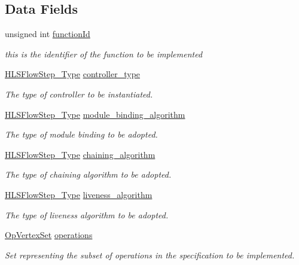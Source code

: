 \subsection*{Data Fields}
\begin{DoxyCompactItemize}
\item 
unsigned int \hyperlink{classhls_a0eaba14187fb5e60a90d3f35d2b138e0}{function\+Id}
\begin{DoxyCompactList}\small\item\em this is the identifier of the function to be implemented \end{DoxyCompactList}\item 
\hyperlink{hls__step_8hpp_ada16bc22905016180e26fc7e39537f8d}{H\+L\+S\+Flow\+Step\+\_\+\+Type} \hyperlink{classhls_a901e0a985cea95b069602fbdf0cdcc94}{controller\+\_\+type}
\begin{DoxyCompactList}\small\item\em The type of controller to be instantiated. \end{DoxyCompactList}\item 
\hyperlink{hls__step_8hpp_ada16bc22905016180e26fc7e39537f8d}{H\+L\+S\+Flow\+Step\+\_\+\+Type} \hyperlink{classhls_a28821b6aa53285a11d8753f1eee83f51}{module\+\_\+binding\+\_\+algorithm}
\begin{DoxyCompactList}\small\item\em The type of module binding to be adopted. \end{DoxyCompactList}\item 
\hyperlink{hls__step_8hpp_ada16bc22905016180e26fc7e39537f8d}{H\+L\+S\+Flow\+Step\+\_\+\+Type} \hyperlink{classhls_aee1a6f122114edf0772f7026143f39f9}{chaining\+\_\+algorithm}
\begin{DoxyCompactList}\small\item\em The type of chaining algorithm to be adopted. \end{DoxyCompactList}\item 
\hyperlink{hls__step_8hpp_ada16bc22905016180e26fc7e39537f8d}{H\+L\+S\+Flow\+Step\+\_\+\+Type} \hyperlink{classhls_afc2f0f903285b792466d4b0b09e26905}{liveness\+\_\+algorithm}
\begin{DoxyCompactList}\small\item\em The type of liveness algorithm to be adopted. \end{DoxyCompactList}\item 
\hyperlink{classOpVertexSet}{Op\+Vertex\+Set} \hyperlink{classhls_a93d8454c7ca39afe832a6fd7cbabd227}{operations}
\begin{DoxyCompactList}\small\item\em Set representing the subset of operations in the specification to be implemented. \end{DoxyCompactList}\item 

\end{DoxyCompactItemize}
